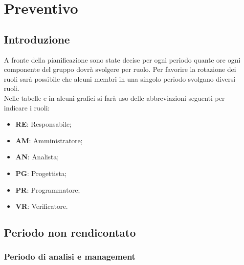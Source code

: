\section{Preventivo} 
	\subsection{Introduzione}
		A fronte della pianificazione sono state decise per ogni periodo quante ore ogni componente del gruppo dovrà svolgere per ruolo.
		Per favorire la rotazione dei ruoli sarà possibile che alcuni membri in una singolo periodo svolgano diversi ruoli. \\
		Nelle tabelle e in alcuni grafici si farà uso delle abbreviazioni seguenti per indicare i ruoli:
		\begin{itemize} 
			\item \textbf{RE}: Responsabile;
			\item \textbf{AM}: Amministratore;
			\item \textbf{AN}: Analista;
			\item \textbf{PG}: Progettista;
			\item \textbf{PR}: Programmatore;
			\item \textbf{VR}: Verificatore.
		\end{itemize}
		
	\newpage	
	\subsection{Periodo non rendicontato}
		
		\subsubsection{Periodo di analisi e management}
		

